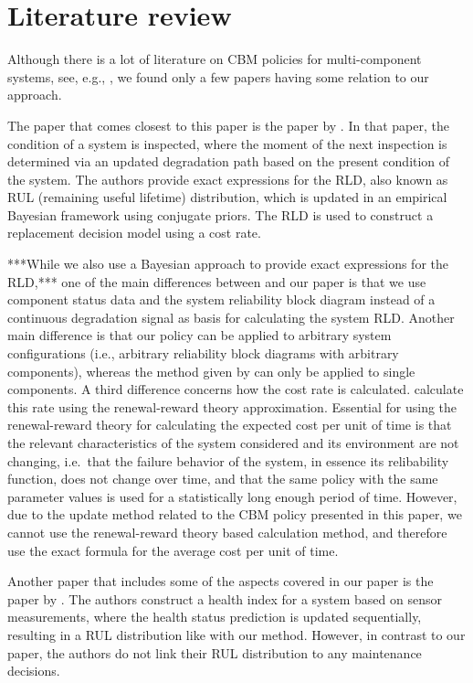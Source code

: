 \documentclass[authoryear]{elsarticle}
\begin{document}
\section{Literature review}
\label{sec:literature}

Although there is a lot of literature on CBM policies for multi-component systems,
see, e.g., \citet{2017:oldekeizer},
we found only a few papers having some relation to our approach.

The paper that comes closest to this paper is the paper by \citet{2013:si-et-al}.
In that paper, the condition of a system is inspected,
where the moment of the next inspection is determined via an updated degradation path based on the present condition of the system.
The authors provide exact expressions for the RLD,
also known as RUL (remaining useful lifetime) distribution,
which is updated in an empirical Bayesian framework using conjugate priors.
The RLD is used to construct a replacement decision model using a cost rate.

***While we also use a Bayesian approach to provide exact expressions for the RLD,***
one of the main differences between \citet{2013:si-et-al} and our paper
is that we use component status data and the system reliability block diagram instead of a continuous degradation signal
as basis for calculating the system RLD.
Another main difference is that our policy can be applied to arbitrary system configurations
(i.e., arbitrary reliability block diagrams with arbitrary components),
whereas the method given by \citet{2013:si-et-al} can only be applied to single components.
A third difference concerns how the cost rate is calculated.
\citet{2013:si-et-al} calculate this rate using the renewal-reward theory approximation.
Essential for using the renewal-reward theory for calculating the expected cost per unit of time
is that the relevant characteristics of the system considered and its environment are not changing,
i.e.\ that the failure behavior of the system,
in essence its relibability function, does not change over time,
and that the same policy with the same parameter values is used for a statistically long enough period of time.
However, due to the update method related to the CBM policy presented in this paper, %
we cannot use the renewal-reward theory based calculation method,
and therefore use the exact formula for the average cost per unit of time.

Another paper that includes some of the aspects covered in our paper is the paper by \citet{2012:sun-et-al}.
The authors construct a health index for a system based on sensor measurements,
where the health status prediction is updated sequentially,
resulting in a RUL distribution like with our method.
However, in contrast to our paper, the authors do not link their RUL distribution to any maintenance decisions.
\end{document}
